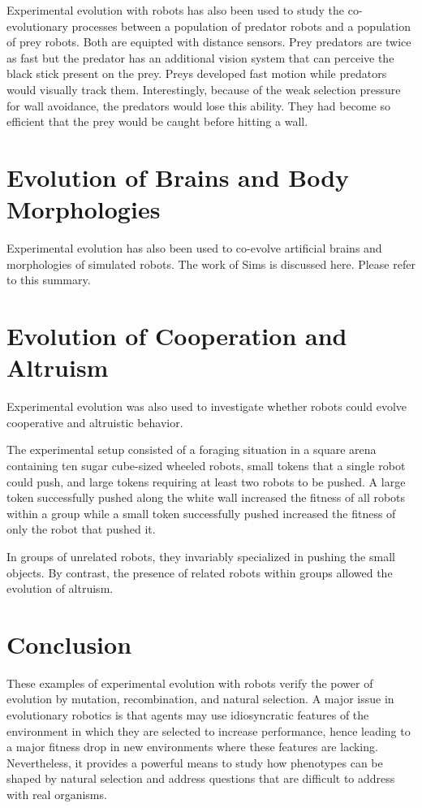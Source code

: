 \documentclass[../main.tex]{subfiles}
\begin{document}
\begin{experiment}
Experimental evolution with robots has also been used to study the co-evolutionary processes between a population of
predator robots and a population of prey robots. Both are equipted with distance sensors. Prey predators are twice as
fast but the predator has an additional vision system that can perceive the black stick present on the prey. Preys
developed fast motion while predators would visually track them. Interestingly, because of the weak selection pressure
for wall avoidance, the predators would lose this ability. They had become so efficient that the prey would be caught
before hitting a wall.
\end{experiment}

\section{Evolution of Brains and Body Morphologies}
Experimental evolution has also been used to co-evolve artificial brains and morphologies of simulated robots. The work
of Sims \cite{Sims:1994:EMB:1667943.1667946} is discussed here. Please refer to this summary.

\section{Evolution of Cooperation and Altruism}
Experimental evolution was also used to investigate whether robots could evolve cooperative and altruistic behavior.

\begin{experiment}
The experimental setup consisted of a foraging situation in a square arena containing ten sugar cube-sized wheeled
robots, small tokens that a single robot could push, and large tokens requiring at least two robots to be pushed. A
large token successfully pushed along the white wall increased the fitness of all robots within a group while a small
token successfully pushed increased the fitness of only the robot that pushed it.

In groups of unrelated robots, they invariably specialized in pushing the small objects. By contrast, the presence of
related robots within groups allowed the evolution of altruism.
\end{experiment}

\section{Conclusion}
These examples of experimental evolution with robots verify the power of evolution by mutation, recombination, and
natural selection. A major issue in evolutionary robotics is that agents may use idiosyncratic features of the
environment in which they are selected to increase performance, hence leading to a major fitness drop in new
environments where these features are lacking. Nevertheless, it provides a powerful means to study how phenotypes can
be shaped by natural selection and address questions that are difficult to address with real organisms.
\end{document}
